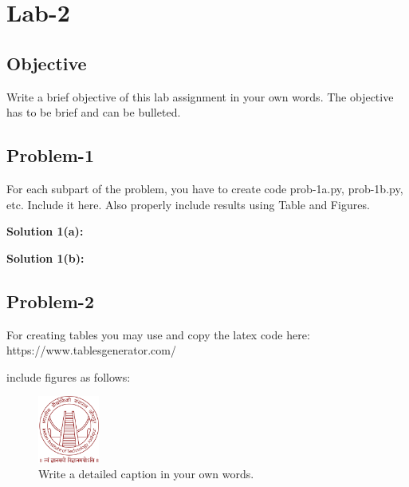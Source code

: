 \chapter{Lab-2}
\section{Objective}
Write a brief objective of this lab assignment in your own words. The objective has to be brief and can be bulleted. 
\section{Problem-1}
For each subpart of the problem, you have to create code prob-1a.py, prob-1b.py, etc. Include it here. Also properly include results using Table and Figures. 

\textbf{Solution 1(a): }


\textbf{Solution 1(b): }

\section{Problem-2}

For creating tables you may use and copy the latex code here: 
https://www.tablesgenerator.com/

include figures as follows:
\begin{figure}[!h]
\centering
\includegraphics[width=2cm]{IITJ Logo__Small.jpeg}
\caption{Write a detailed caption in your own words.}
\label{fig:sample}
\end{figure}